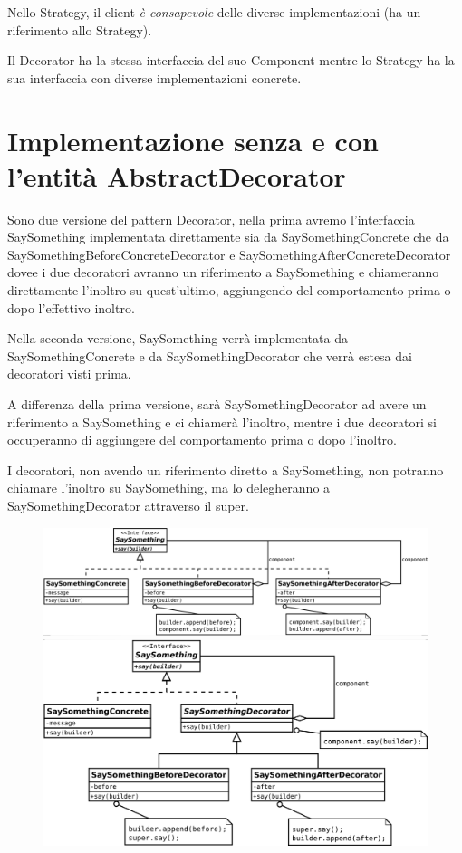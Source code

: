 Nello Strategy, il client \textit{è consapevole} delle diverse implementazioni (ha un riferimento allo Strategy).

Il Decorator ha la stessa interfaccia del suo Component mentre lo Strategy ha la sua interfaccia con diverse implementazioni concrete.

\section{Implementazione senza e con l'entità AbstractDecorator}

Sono due versione del pattern Decorator, nella prima avremo l'interfaccia SaySomething implementata direttamente sia da SaySomethingConcrete che da 
SaySomethingBeforeConcreteDecorator e SaySomethingAfterConcreteDecorator dovee i due decoratori avranno un riferimento a SaySomething e chiameranno direttamente 
l'inoltro su quest'ultimo, aggiungendo del comportamento prima o dopo l'effettivo inoltro.

Nella seconda versione, SaySomething verrà implementata da SaySomethingConcrete e da SaySomethingDecorator che verrà estesa dai decoratori visti prima.

A differenza della prima versione, sarà SaySomethingDecorator ad avere un riferimento a SaySomething e ci chiamerà l'inoltro, mentre i due decoratori si occuperanno di 
aggiungere del comportamento prima o dopo l'inoltro.

I decoratori, non avendo un riferimento diretto a SaySomething, non potranno chiamare l'inoltro su SaySomething, ma lo delegheranno a SaySomethingDecorator attraverso 
il super.

\begin{figure}[H]
\begin{minipage}[c]{9cm}
    \includegraphics[width=1\linewidth]{../../immagini/decorator/senza_AbstractDecorator}
\end{minipage}
\hfill
\begin{minipage}[c]{8cm}
    \includegraphics[width=1\linewidth]{../../immagini/decorator/con_AbstractDecorator}
\end{minipage}
\end{figure}

